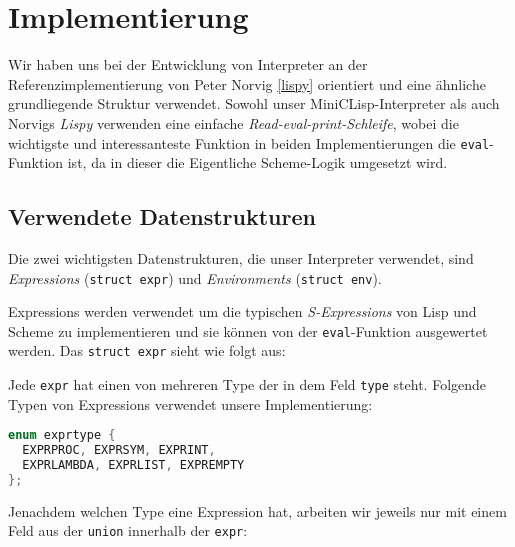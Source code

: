 \label{implementierung}
\section[Implementierung]{Implementierung}

Wir haben uns bei der Entwicklung von Interpreter an der Referenzimplementierung
von Peter Norvig \ref{lispy} orientiert und eine ähnliche grundliegende
Struktur verwendet. Sowohl unser MiniCLisp-Interpreter als auch Norvigs
\emph{Lispy} verwenden eine einfache \emph{Read-eval-print-Schleife}, wobei
die wichtigste und interessanteste Funktion in beiden Implementierungen die
\texttt{eval}-Funktion ist, da in dieser die Eigentliche Scheme-Logik
umgesetzt wird.

\subsection[Datenstrukturen]{Verwendete Datenstrukturen}
Die zwei wichtigsten Datenstrukturen, die unser Interpreter verwendet, sind 
\emph{Expressions} (\texttt{struct expr}) und \emph{Environments} (\texttt{struct env}).
\par
Expressions werden verwendet um die typischen \emph{S-Expressions} von
Lisp und Scheme zu implementieren und sie können von der \texttt{eval}-Funktion
ausgewertet werden. Das \texttt{struct expr} sieht wie folgt aus:

Jede \texttt{expr} hat einen von mehreren Type der in dem Feld \texttt{type}
steht. Folgende Typen von Expressions verwendet unsere Implementierung:
\begin{lstlisting}[language=C]
enum exprtype {
  EXPRPROC, EXPRSYM, EXPRINT,
  EXPRLAMBDA, EXPRLIST, EXPREMPTY
};
\end{lstlisting}
Jenachdem welchen Type eine Expression hat, arbeiten wir jeweils nur mit einem
Feld aus der \texttt{union} innerhalb der \texttt{expr}:
